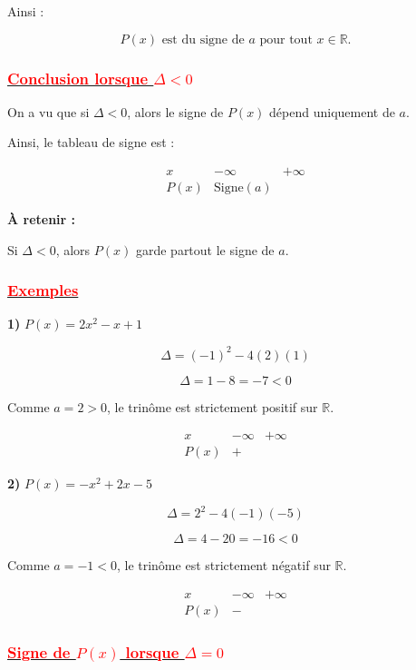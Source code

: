\documentclass[12pt,a4paper]{article}
\begin{document}
Ainsi :

\[
P(x) \text{ est du signe de } a \text{ pour tout } x\in\mathbb{R}.
\]
\subsubsection*{\underline{\textcolor{red}{Conclusion lorsque $\Delta < 0$}}}

On a vu que si $\Delta < 0$, alors le signe de $P(x)$ dépend uniquement de $a$.

Ainsi, le tableau de signe est :

\[
\begin{array}{c|cc}
x & -\infty & +\infty \\
\hline
P(x) & \text{Signe}(a)
\end{array}
\]

\bigskip

\textbf{À retenir :}

Si $\Delta < 0$, alors $P(x)$ garde partout le signe de $a$.

\bigskip

\subsubsection*{\underline{\textcolor{red}{Exemples}}}

\textbf{1) } $P(x)=2x^2 - x + 1$

\[
\Delta = (-1)^2 - 4(2)(1)
\]

\[
\Delta = 1 - 8 = -7 < 0
\]

Comme $a=2>0$, le trinôme est strictement positif sur $\mathbb{R}$.

\[
\begin{array}{c|cc}
x & -\infty & +\infty \\
\hline
P(x) & +
\end{array}
\]

\bigskip

\textbf{2) } $P(x)=-x^2 + 2x - 5$

\[
\Delta = 2^2 - 4(-1)(-5)
\]

\[
\Delta = 4 - 20 = -16 < 0
\]

Comme $a=-1<0$, le trinôme est strictement négatif sur $\mathbb{R}$.

\[
\begin{array}{c|cc}
x & -\infty & +\infty \\
\hline
P(x) & -
\end{array}
\]
\subsubsection*{\underline{\textcolor{red}{Signe de $P(x)$ lorsque $\Delta = 0$}}}
\end{document}
